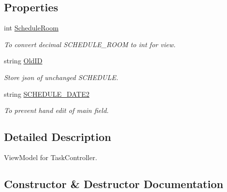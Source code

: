 \subsection*{Properties}
\begin{DoxyCompactItemize}
\item 
int \hyperlink{class_in_study_asp_1_1_models_1_1_user_1_1_teacher_1_1_view_model_schedule_a8de805afbeab5943816641787f787071}{Schedule\+Room}
\begin{DoxyCompactList}\small\item\em To convert decimal S\+C\+H\+E\+D\+U\+L\+E\+\_\+\+R\+O\+OM to int for view. \end{DoxyCompactList}\item 
string \hyperlink{class_in_study_asp_1_1_models_1_1_user_1_1_teacher_1_1_view_model_schedule_a8263bc709f1e63fd8d4406f1ad2d9f6f}{Old\+ID}
\begin{DoxyCompactList}\small\item\em Store json of unchanged S\+C\+H\+E\+D\+U\+LE. \end{DoxyCompactList}\item 
string \hyperlink{class_in_study_asp_1_1_models_1_1_user_1_1_teacher_1_1_view_model_schedule_a36455e485d079b033236de1c892adb8f}{S\+C\+H\+E\+D\+U\+L\+E\+\_\+\+D\+A\+T\+E2}
\begin{DoxyCompactList}\small\item\em To prevent hand edit of main field. \end{DoxyCompactList}\end{DoxyCompactItemize}


\subsection{Detailed Description}
View\+Model for Task\+Controller. 

\subsection{Constructor \& Destructor Documentation}
\mbox{\label{class_in_study_asp_1_1_models_1_1_user_1_1_teacher_1_1_view_model_schedule_a2a6f9735138119885135e10599792ebc}} 
